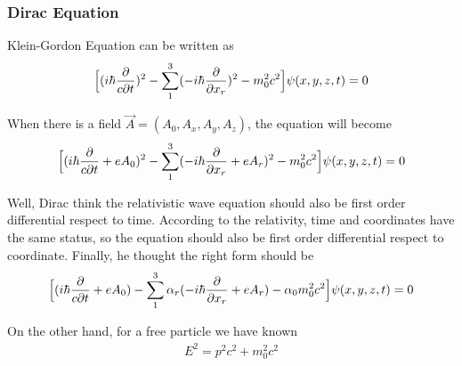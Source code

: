 \subsubsection{Dirac Equation}

Klein-Gordon Equation can be written as 
\begin{align*}
	\Big[ (i\hbar\frac{\partial}{c \partial t} )^2-\sum_1^3 (-i\hbar \frac{\partial}{\partial x_r} )^2-m_0^2c^2  \Big]\psi(x,y,z,t)=0
\end{align*}

When there is a field $\vec{A}=(A_0,A_x,A_y,A_z)$, the equation will become 
\begin{align*}
	\Big[ (i\hbar\frac{\partial}{c \partial t} +eA_0)^2-\sum_1^3 (-i\hbar \frac{\partial}{\partial x_r} +eA_r)^2-m_0^2c^2  \Big]\psi(x,y,z,t)=0
\end{align*}

Well, Dirac think the relativistic wave equation should also be first order differential respect to time. According to the relativity, time and coordinates have the same status, so the equation should also be first order differential respect to coordinate.  Finally, he thought the right form should be 
\begin{align*}
	\Big[ (i\hbar\frac{\partial}{c \partial t} +eA_0)-\sum_1^3 \alpha_r(-i\hbar \frac{\partial}{\partial x_r} +eA_r)-\alpha_0m_0^2c^2  \Big]\psi(x,y,z,t)=0
\end{align*}

On the other hand, for a free particle we have known
\begin{align*}
	E^2=p^2c^2+m_0^2c^2
\end{align*}




